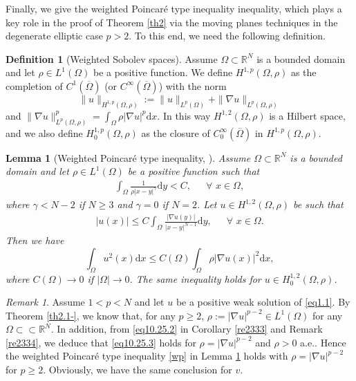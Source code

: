 \documentclass[12pt]{amsart}
\newtheorem{lem}[thm]{Lemma}
\theoremstyle{definition}
\newtheorem{defn}[thm]{Definition}
\theoremstyle{remark}
\newtheorem{rem}[thm]{Remark}
\theoremstyle{conclusion}
\theoremstyle{conjecture}
\numberwithin{equation}{section}
\newcommand{\R}{\mathbb{R}}
\begin{document}
Finally, we give the weighted Poincar\'{e} type inequality inequality, which plays a key role in the proof of Theorem \ref{th2} via the moving planes techniques in the degenerate elliptic case $p>2$. To this end, we need the following definition.
\begin{defn}[Weighted Sobolev spaces]\label{lm.3-}
Assume $\Omega\subset\R^N$ is a bounded domain and let $\rho\in L^1(\Omega)$ be a positive function. We define $H^{1,p}(\Omega,\rho)$ as the completion of $C^1(\overline{\Omega})$ (or $C^\infty(\overline{\Omega})$) with the norm
$$ \| u\|_{ H^{1,p}(\Omega,\rho) } := \| u \|_{L^p(\Omega)} + \| \nabla u\|_{L^p(\Omega,\rho)}$$
and $\| \nabla u\|^p_{L^p(\Omega,\rho)} = \int_\Omega  \rho  |\nabla u |^p \mathrm{d}x$. In this way $H^{1,2}(\Omega,\rho)$ is a Hilbert space, and we also define $H_0^{1,p}(\Omega,\rho)$ as the closure of $C_0^\infty(\overline{\Omega})$ in $H^{1,p}(\Omega,\rho)$.
\end{defn}

\begin{lem}[Weighted Poincar\'{e} type inequality, \cite{LDBS04,FV,LPLDHT}]\label{lm.3}
Assume $\Omega\subset\R^N$ is a bounded domain and let $\rho\in L^1(\Omega)$ be a positive function such that
\begin{align}\label{eq10.25.3}
\int_\Omega \frac{1}{\rho |x-y|^\gamma}\mathrm{d}y < C, \,\,\,\quad \forall \,\, x\in\Omega,
\end{align}
where $\gamma<N-2$ if $N \geq 3$ and $\gamma=0$ if $N = 2$. Let $u\in H^{1,2}(\Omega,\rho)$ be such that
\begin{align}\label{eq10.25.4}
|u(x)|\leq C \int_\Omega \frac{|\nabla u(y)|}{ |x-y|^{N-1}}\mathrm{d}y,\quad\,\,\,\forall \,\, x\in\Omega.
\end{align}
Then we have
\begin{equation}\label{wp}
  \int_\Omega u^2(x) \mathrm{d}x \leq C(\Omega) \int_\Omega \rho |\nabla u(x)|^2 \mathrm{d}x,
\end{equation}
where $C(\Omega)\to 0$ if $|\Omega|\to 0$. The same inequality holds for $u\in H^{1,2}_0(\Omega,\rho)$.
\end{lem}

\begin{rem}\label{rem0}
Assume $1<p<N$ and let $u$ be a positive weak solution of \eqref{eq1.1}. By Theorem \ref{th2.1-}, we know that, for any $p\geq2$, $\rho:=|\nabla u|^{p-2}\in L^1(\Omega)$ for any $\Omega\subset\subset\R^N$. In addition, from \eqref{eq10.25.2} in Corollary \ref{re2333} and Remark \ref{re2334}, we deduce that \eqref{eq10.25.3} holds for $\rho=|\nabla u|^{p-2}$ and $\rho>0$ a.e.. Hence the weighted Poincar\'{e} type inequality \eqref{wp} in Lemma \ref{lm.3} holds with $\rho=|\nabla u|^{p-2}$ for $p\geq2$. Obviously, we have the same conclusion for $v$.
\end{rem}
\end{document}
